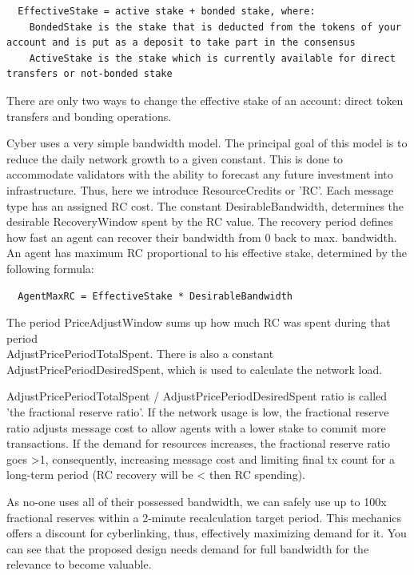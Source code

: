 \documentclass[8pt,oneside]{amsart}
\newcommand{\code}[1]{{\PlayBold #1}}
\begin{document}
\begin{Abstract}
\begin{lstlisting}
  EffectiveStake = active stake + bonded stake, where:
    BondedStake is the stake that is deducted from the tokens of your account and is put as a deposit to take part in the consensus
    ActiveStake is the stake which is currently available for direct transfers or not-bonded stake
\end{lstlisting}

There are only two ways to change the effective stake of an account: direct token transfers and bonding operations.

Cyber uses a very simple bandwidth model. The principal goal of this model is to reduce the daily network growth to a given constant. This is done to accommodate validators with the ability to forecast any future investment into infrastructure. Thus, here we introduce \code{ResourceCredits} or 'RC'. Each message type has an assigned RC cost. The constant \code{DesirableBandwidth}, determines the desirable \code{RecoveryWindow} spent by the RC value. The recovery period defines how fast an agent can recover their bandwidth from 0 back to max. bandwidth. An agent has maximum RC  proportional to his effective stake, determined by the following formula:

\begin{lstlisting}
  AgentMaxRC = EffectiveStake * DesirableBandwidth
\end{lstlisting}

The period \code{PriceAdjustWindow} sums up how much RC was spent during that period\\ \code{AdjustPricePeriodTotalSpent}. There is also a constant \code{AdjustPricePeriodDesiredSpent}, which is used to calculate the network load.

\code{AdjustPricePeriodTotalSpent / AdjustPricePeriodDesiredSpent} ratio is called 'the fractional reserve ratio'. If the network usage is low, the fractional reserve ratio adjusts message cost to allow agents with a lower stake to commit more transactions. If the demand for resources increases, the fractional reserve ratio goes \code{>1}, consequently, increasing message cost and limiting final tx count for a long-term period (RC recovery will be \code{<} then RC spending).

As no-one uses all of their possessed bandwidth, we can safely use up to 100x fractional reserves within a 2-minute recalculation target period. This mechanics offers a discount for cyberlinking, thus, effectively maximizing demand for it. You can see that the proposed design needs demand for full bandwidth for the relevance to become valuable.


\end{Abstract}
\end{document}
